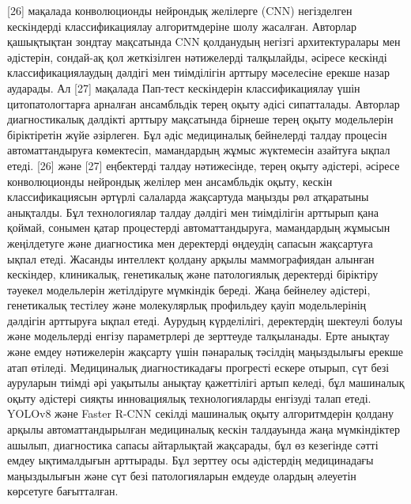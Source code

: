{[}26{]} мақалада конволюционды нейрондық желілерге (CNN) негізделген
кескіндерді классификациялау алгоритмдеріне шолу жасалған. Авторлар
қашықтықтан зондтау мақсатында CNN қолданудың негізгі архитектуралары
мен әдістерін, сондай-ақ қол жеткізілген нәтижелерді талқылайды, әсіресе
кескінді классификациялаудың дәлдігі мен тиімділігін арттыру мәселесіне
ерекше назар аударады. Ал {[}27{]} мақалада Пап-тест кескіндерін
классификациялау үшін цитопатологтарға арналған ансамбльдік терең оқыту
әдісі сипатталады. Авторлар диагностикалық дәлдікті арттыру мақсатында
бірнеше терең оқыту модельлерін біріктіретін жүйе әзірлеген. Бұл әдіс
медициналық бейнелерді талдау процесін автоматтандыруға көмектесіп,
мамандардың жұмыс жүктемесін азайтуға ықпал етеді. {[}26{]} және
{[}27{]} еңбектерді талдау нәтижесінде, терең оқыту әдістері, әсіресе
конволюционды нейрондық желілер мен ансамбльдік оқыту, кескін
классификациясын әртүрлі салаларда жақсартуда маңызды рөл атқаратыны
анықталды. Бұл технологиялар талдау дәлдігі мен тиімділігін арттырып
қана қоймай, сонымен қатар процестерді автоматтандыруға, мамандардың
жұмысын жеңілдетуге және диагностика мен деректерді өңдеудің сапасын
жақсартуға ықпал етеді. Жасанды интеллект қолдану арқылы маммографиядан
алынған кескіндер, клиникалық, генетикалық және патологиялық деректерді
біріктіру тәуекел модельлерін жетілдіруге мүмкіндік береді. Жаңа
бейнелеу әдістері, генетикалық тестілеу және молекулярлық профильдеу
қауіп модельлерінің дәлдігін арттыруға ықпал етеді. Аурудың күрделілігі,
деректердің шектеулі болуы және модельлерді енгізу параметрлері де
зерттеуде талқыланады. Ерте анықтау және емдеу нәтижелерін жақсарту үшін
пәнаралық тәсілдің маңыздылығы ерекше атап өтіледі. Медициналық
диагностикадағы прогресті ескере отырып, сүт безі ауруларын тиімді әрі
уақытылы анықтау қажеттілігі артып келеді, бұл машиналық оқыту әдістері
сияқты инновациялық технологияларды енгізуді талап етеді. YOLOv8 және
Faster R-CNN секілді машиналық оқыту алгоритмдерін қолдану арқылы
автоматтандырылған медициналық кескін талдауында жаңа мүмкіндіктер
ашылып, диагностика сапасы айтарлықтай жақсарады, бұл өз кезегінде сәтті
емдеу ықтималдығын арттырады. Бұл зерттеу осы әдістердің медицинадағы
маңыздылығын және сүт безі патологияларын емдеуде олардың әлеуетін
көрсетуге бағытталған.


